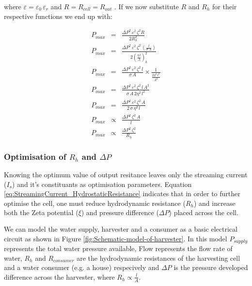 where $\varepsilon=\varepsilon_{0}\,\varepsilon_{r}$ and $R=R_{cell}=R_{out}$ .
If we now substitute $R$ and $R_{h}$ for their respective functions we end up
with:

\begin{eqnarray} P_{max} & = & \frac{\Delta
        P^{2}\,\varepsilon^{2}\,\zeta^{2}R}{2R_{h}^{2}}\nonumber \\ P_{max} & =
    & \frac{\Delta P^{2}\,\varepsilon^{2}\,\zeta^{2}\,\left(\frac{l}{\sigma\,
                A}\right)}{2\left(\frac{\eta\, l}{A}\right)_{h}^{2}}\nonumber
    \\ P_{max} & = & \frac{\Delta P^{2}\,\varepsilon^{2}\,\zeta^{2}\,
        l}{\sigma\, A}\times\frac{1}{\frac{2\eta^{2}\, l^{2}}{A^{2}}}\nonumber
    \\ P_{max} & = & \frac{\Delta P^{2}\,\varepsilon^{2}\,\zeta^{2}\, l\,
        A^{2}}{\sigma\, A\,2\eta^{2}\, l^{2}}\nonumber \\ P_{max} & = &
    \frac{\Delta P^{2}\,\varepsilon^{2}\,\zeta^{2}\, A}{2\,\sigma\,\eta^{2}\,
        l}\nonumber \\ P_{max} & \propto & \frac{\Delta P^{2}\,\zeta^{2}\,
        A}{l}\nonumber \\ P_{max} & \propto & \frac{\Delta
        P^{2}\,\zeta^{2}}{R_{h}} \end{eqnarray}



\subsubsection*{Optimisation of $R_{h}$ and $\Delta P$}

Knowing the optimum value of output resitance leaves only the streaming current
($I_{s}$) and it's constituants as optimisation parameters.  Equation
\ref{eq:StreamingCurrent_HydrostaticResistance} indicates that in order to
further optimise the cell, one must reduce hydrodynamic resistance ($R_{h}$)
and increase both the Zeta potential ($\xi$) and pressure difference ($\Delta
P$) placed across the cell.

We can model the water supply, harvester and a consumer as a basic electrical
circuit as shown in Figure \ref{fig:Schematic-model-of-harvester}.  In this
model $P_{supply}$ represents the total water pressure available, Flow
represents the flow rate of water, $R_{h}$ and $R_{consumer}$ are the
hydrodynamic resistances of the harvesting cell and a water consumer (e.g. a
house) respecively and $\Delta P$ is the pressure developed difference across
the harvester, where $R_{h}\propto\frac{l}{A}$.

